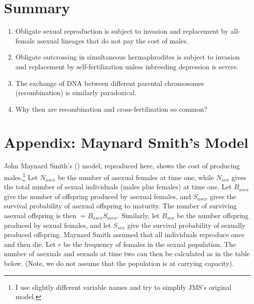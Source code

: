 \documentclass[
  letterpaper,
]{book}
\providecommand{\tightlist}{%
  \setlength{\itemsep}{0pt}\setlength{\parskip}{0pt}}\usepackage{longtable,booktabs,array}
\begin{document}
\section{Summary}\label{summary}

\begin{enumerate}
\def\labelenumi{\arabic{enumi}.}
\tightlist
\item
  Obligate sexual reproduction is subject to invasion and replacement by
  all-female asexual lineages that do not pay the cost of males.
\item
  Obligate outcrossing in simultaneous hermaphrodites is subject to
  invasion and replacement by self-fertilization unless inbreeding
  depression is severe.
\item
  The exchange of DNA between different parental chromosomes
  (recombination) is similarly paradoxical.
\item
  Why then are recombination and cross-fertilization so common?
\end{enumerate}

\section{Appendix: Maynard Smith's Model}\label{sec-app-1}

John Maynard Smith's () model,
reproduced here, shows the cost of producing males.\footnote{I use
  slightly different variable names and try to simplify JMS's original
  model.} Let \(N_{asex}\) be the number of asexual females at time one,
while \(N_{sex}\) gives the total number of sexual individuals (males
plus females) at time one. Let \(B_{asex}\) give the number of offspring
produced by asexual females, and \(S_{asex}\) gives the survival
probability of asexual offspring to maturity. The number of surviving
asexual offspring is then \(= B_{asex}S_{asex}\). Similarly, let
\(B_{sex}\) be the number offspring produced by sexual females, and let
\(S_{sex}\) give the survival probability of sexually produced
offspring. Maynard Smith assumed that all individuals reproduce once and
then die. Let \(r\) be the frequency of females in the sexual
population. The number of asexuals and sexuals at time two can then be
calculated as in the table below. (Note, we do not assume that the
population is at carrying capacity).
\end{document}
